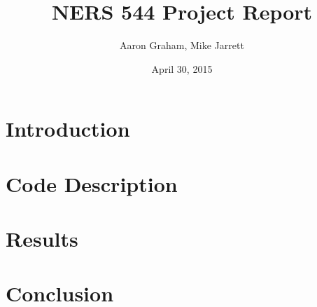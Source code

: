 \documentclass[letterpaper]{article}
\begin{document}
\begin{titlepage}
\clearpage
\title{\LARGE NERS 544 Project Report}
\author{Aaron Graham, Mike Jarrett}
\date{April 30, 2015}
\maketitle
\thispagestyle{empty}
\end{titlepage}

\pagebreak

\section{Introduction}



\section{Code Description}



\section{Results}



\section{Conclusion}


\end{document}
